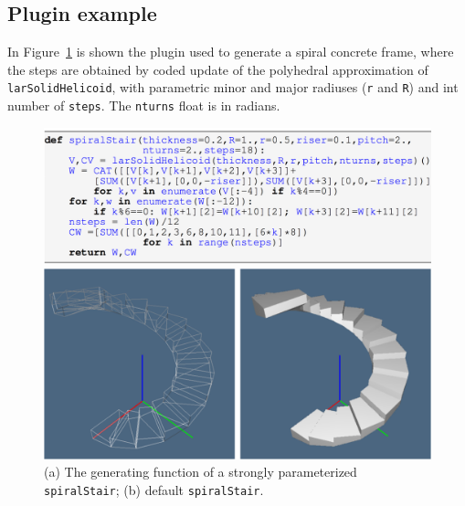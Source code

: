 \vspace{-1mm}\subsection{Plugin example}\vspace{-3mm}

In Figure~\ref{spiralstair} is shown the plugin used to generate a spiral concrete frame, where the steps are obtained by coded update of the polyhedral approximation of \texttt{larSolidHelicoid}, with parametric minor and major radiuses (\texttt{r} and \texttt{R}) and int number of \texttt{steps}. The \texttt{nturns} float is in radians.

\begin{figure}[h] %
   \centering
   \includegraphics[width=\linewidth]{images/spiralstair}
   
   \includegraphics[width=\linewidth]{images/spiralstair2}
   \caption{(a) The generating function of a strongly parameterized \texttt{spiralStair}; (b) default \texttt{spiralStair}.}
   \label{spiralstair}
\end{figure}


